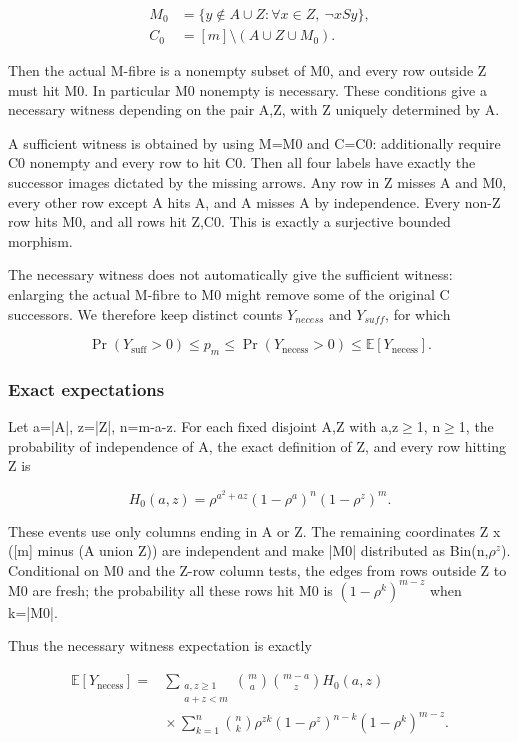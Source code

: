 \documentclass[11pt]{article}
\begin{document}
\[
\begin{aligned}
M_0&=\{y\notin A\cup Z:\forall x\in Z,\ \neg xSy\},\\
C_0&=[m]\setminus(A\cup Z\cup M_0).
\end{aligned}
\]

Then the actual M-fibre is a nonempty subset of M0, and every row outside Z must hit M0. In particular M0 nonempty is necessary. These conditions give a necessary witness depending on the pair A,Z, with Z uniquely determined by A.

A sufficient witness is obtained by using M=M0 and C=C0: additionally require C0 nonempty and every row to hit C0. Then all four labels have exactly the successor images dictated by the missing arrows. Any row in Z misses A and M0, every other row except A hits A, and A misses A by independence. Every non-Z row hits M0, and all rows hit Z,C0. This is exactly a surjective bounded morphism.

The necessary witness does not automatically give the sufficient witness: enlarging the actual M-fibre to M0 might remove some of the original C successors. We therefore keep distinct counts $Y_{necess}$ and $Y_{suff}$, for which

\[
\Pr(Y_{\mathrm{suff}}>0)\leq p_m\leq\Pr(Y_{\mathrm{necess}}>0)\leq\mathbb E[Y_{\mathrm{necess}}].
\]

\subsubsection{Exact expectations}

Let a=|A|, z=|Z|, n=m-a-z. For each fixed disjoint A,Z with a,z\ensuremath{\geq}1, n\ensuremath{\geq}1, the probability of independence of A, the exact definition of Z, and every row hitting Z is

\[
H_0(a,z)=\rho^{a^2+az}(1-\rho^a)^n(1-\rho^z)^m.
\]

These events use only columns ending in A or Z. The remaining coordinates Z x ([m] minus (A union Z)) are independent and make |M0| distributed as Bin(n,$\rho^{z}$). Conditional on M0 and the Z-row column tests, the edges from rows outside Z to M0 are fresh; the probability all these rows hit M0 is $(1-\rho^k)^{m-z}$ when k=|M0|.

Thus the necessary witness expectation is exactly

\[
\begin{aligned}\mathbb E[Y_{\mathrm{necess}}]
={}&\sum_{\substack{a,z\geq1\\a+z<m}}\binom ma\binom{m-a}{z}H_0(a,z)\\
&{}\times\sum_{k=1}^n\binom nk\rho^{zk}(1-\rho^z)^{n-k}(1-\rho^k)^{m-z}.
\end{aligned}
\]
\end{document}
